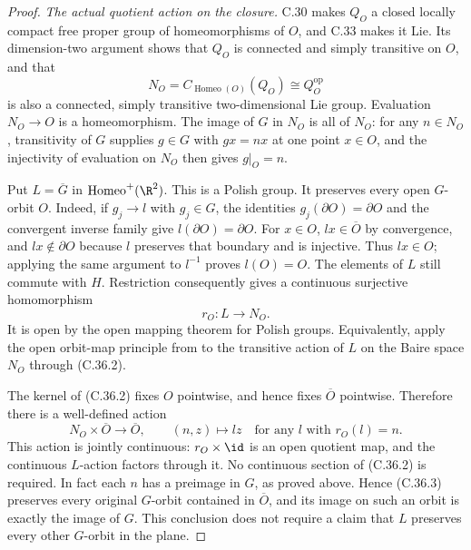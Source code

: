 \begin{proof}
\emph{The actual quotient action on the closure.}
C.30 makes $Q_O$ a closed locally compact free proper
group of homeomorphisms of $O$, and C.33 makes it Lie.
Its dimension-two argument shows that $Q_O$ is
connected and simply transitive on $O$, and that
\[
 N_O=C_{\operatorname{Homeo}(O)}(Q_O)
                    \cong Q_O^{\mathrm{op}}             \tag{C.36.1}
\]
is also a connected, simply transitive two-dimensional
Lie group. Evaluation $N_O\to O$ is a homeomorphism.
The image of $G$ in $N_O$ is all of $N_O$: for any
$n\in N_O$, transitivity of $G$ supplies $g\in G$
with $gx=nx$ at one point $x\in O$, and the
injectivity of evaluation on $N_O$ then gives
$g|_O=n$.

Put $L=\overline G$ in $\operatorname{Homeo}^+(\R^2)$.
This is a Polish group. It preserves every open
$G$-orbit $O$. Indeed, if $g_j\to l$ with $g_j\in G$,
the identities $g_j(\partial O)=\partial O$ and
the convergent inverse family give
$l(\partial O)=\partial O$. For $x\in O$,
$lx\in\overline O$ by convergence, and
$lx\notin\partial O$ because $l$ preserves that
boundary and is injective. Thus $lx\in O$;
applying the same argument to $l^{-1}$ proves
$l(O)=O$.
The elements of $L$ still commute with $H$.
Restriction consequently gives a continuous
surjective homomorphism
\[
                   r_O:L\longrightarrow N_O.            \tag{C.36.2}
\]
It is open by the open mapping theorem for Polish
groups. Equivalently, apply the open orbit-map
principle from
\cite[Theorem~3.5]{C_GomezPinedoUzcategui2017}
to the transitive action of $L$ on the Baire
space $N_O$ through (C.36.2).

The kernel of (C.36.2) fixes $O$ pointwise, and
hence fixes $\overline O$ pointwise. Therefore
there is a well-defined action
\[
 N_O\times\overline O\longrightarrow\overline O,
       \qquad(n,z)\longmapsto lz
                 \quad\text{for any }l\text{ with }r_O(l)=n.
                                                        \tag{C.36.3}
\]
This action is jointly continuous: $r_O\times\id$
is an open quotient map, and the continuous
$L$-action factors through it. No continuous
section of (C.36.2) is required.
In fact each $n$ has a preimage in $G$, as proved
above. Hence (C.36.3) preserves every original
$G$-orbit contained in $\overline O$, and its
image on such an orbit is exactly the image of
$G$. This conclusion does not require a claim
that $L$ preserves every other $G$-orbit in the
plane.


\end{proof}
